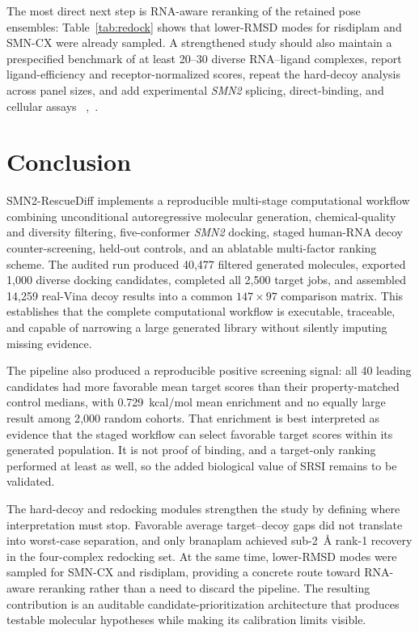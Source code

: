 \documentclass[journal]{IEEEtran}
\begin{document}
The most direct next step is RNA-aware reranking of the retained pose
ensembles: Table~\ref{tab:redock} shows that lower-RMSD modes for
risdiplam and SMN-CX were already sampled. A strengthened study should
also maintain a prespecified benchmark of at least 20--30 diverse
RNA--ligand complexes, report ligand-efficiency and receptor-normalized
scores, repeat the hard-decoy analysis across panel sizes, and add
experimental \textit{SMN2} splicing, direct-binding, and cellular assays
~\cite{aslesh2022},~\cite{chong2021}.

\section{Conclusion}
SMN2-RescueDiff implements a reproducible multi-stage computational
workflow combining unconditional autoregressive molecular generation,
chemical-quality and diversity filtering, five-conformer \textit{SMN2}
docking, staged human-RNA decoy counter-screening, held-out controls,
and an ablatable multi-factor ranking scheme. The audited run produced
40{,}477 filtered generated molecules, exported 1{,}000 diverse docking
candidates, completed all 2{,}500 target jobs, and assembled 14{,}259
real-Vina decoy results into a common $147\times97$ comparison matrix.
This establishes that the complete computational workflow is executable,
traceable, and capable of narrowing a large generated library without
silently imputing missing evidence.

The pipeline also produced a reproducible positive screening signal:
all 40 leading candidates had more favorable mean target scores than
their property-matched control medians, with 0.729~kcal/mol mean
enrichment and no equally large result among 2{,}000 random cohorts.
That enrichment is best interpreted as evidence that the staged workflow
can select favorable target scores within its generated population. It
is not proof of binding, and a target-only ranking performed at least as
well, so the added biological value of SRSI remains to be validated.

The hard-decoy and redocking modules strengthen the study by defining
where interpretation must stop. Favorable average target--decoy gaps did
not translate into worst-case separation, and only branaplam achieved
sub-2~\AA{} rank-1 recovery in the four-complex redocking set. At the
same time, lower-RMSD modes were sampled for SMN-CX and risdiplam,
providing a concrete route toward RNA-aware reranking rather than a need
to discard the pipeline. The resulting contribution is an auditable
candidate-prioritization architecture that produces testable molecular
hypotheses while making its calibration limits visible.
\end{document}
